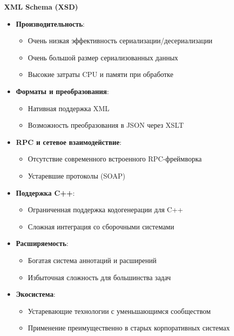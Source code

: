         \textbf{XML Schema (XSD)}

            \begin{itemize}
                \item \textbf{Производительность}:
                \begin{itemize}
                    \item Очень низкая эффективность сериализации/десериализации
                    \item Очень большой размер сериализованных данных
                    \item Высокие затраты CPU и памяти при обработке
                \end{itemize}

                \item \textbf{Форматы и преобразования}:
                \begin{itemize}
                    \item Нативная поддержка XML
                    \item Возможность преобразования в JSON через XSLT
                \end{itemize}

                \item \textbf{RPC и сетевое взаимодействие}:
                \begin{itemize}
                    \item Отсутствие современного встроенного RPC-фреймворка
                    \item Устаревшие протоколы (SOAP)
                \end{itemize}

                \item \textbf{Поддержка C++}:
                \begin{itemize}
                    \item Ограниченная поддержка кодогенерации для C++
                    \item Сложная интеграция со сборочными системами
                \end{itemize}

                \item \textbf{Расширяемость}:
                \begin{itemize}
                    \item Богатая система аннотаций и расширений
                    \item Избыточная сложность для большинства задач
                \end{itemize}

                \item \textbf{Экосистема}:
                \begin{itemize}
                    \item Устаревающие технологии с уменьшающимся сообществом
                    \item Применение преимущественно в старых корпоративных системах
                \end{itemize}
            \end{itemize}

